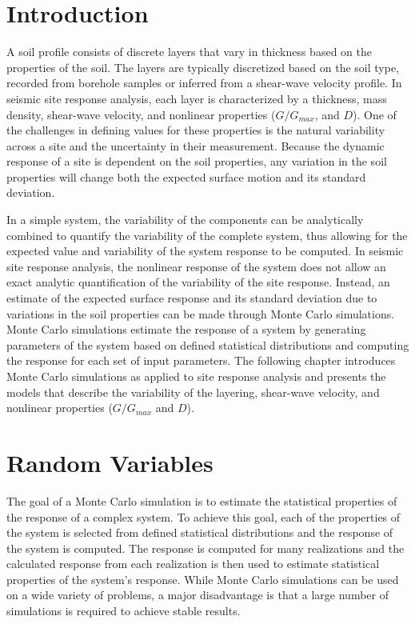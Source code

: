 \documentclass[12pt,oneside]{book}
\begin{document}
\section{Introduction}
A soil profile consists of discrete layers that vary in thickness based on the properties of the
soil.  The layers are typically discretized based on the soil type, recorded from borehole samples
or inferred from a shear-wave velocity profile. In seismic site response analysis, each layer is
characterized by a thickness, mass density, shear-wave velocity, and nonlinear properties
($G/G_{max}$, and $D$).  One of the challenges in defining values for these properties is the
natural variability across a site and the uncertainty in their measurement.  Because the dynamic response of
a site is dependent on the soil properties, any variation in the soil properties will change both
the expected surface motion and its standard deviation.

In a simple system, the variability of the components can be analytically combined to quantify the
variability of the complete system, thus allowing for the expected value and variability of the
system response to be computed. In seismic site response analysis, the nonlinear response of the
system does not allow an exact analytic quantification of the variability of the site response.
Instead, an estimate of the expected surface response and its standard deviation due to variations
in the soil properties can be made through Monte Carlo simulations.  Monte Carlo simulations
estimate the response of a system by generating parameters of the system based on defined
statistical distributions and computing the response for each set of input parameters.  The
following chapter introduces Monte Carlo simulations as applied to site response analysis and
presents the models that describe the variability of the layering, shear-wave velocity, and
nonlinear properties ($G/G_{max}$ and $D$).  

\section{Random Variables}
The goal of a Monte Carlo simulation is to estimate the statistical properties of the response of a
complex system.  To achieve this goal, each of the properties of the system is selected from defined
statistical distributions and the response of the system is computed.  The response is computed for
many realizations and the calculated response from each realization is then used to estimate
statistical properties of the system's response. While Monte Carlo simulations can be used on a wide
variety of problems, a major disadvantage is that a large number of simulations is required to
achieve stable results.
\end{document}
